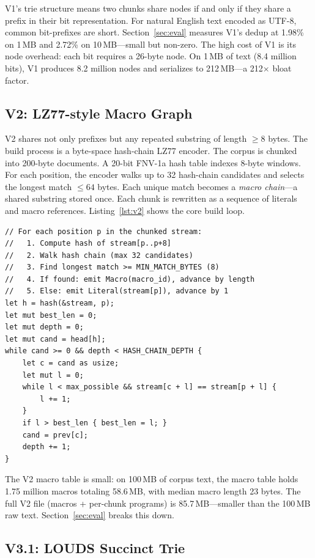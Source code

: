 \documentclass[conference]{IEEEtran}
\begin{document}
V1's trie structure means two chunks share nodes if and only if they share a prefix in their bit representation. For natural English text encoded as UTF-8, common bit-prefixes are short. Section~\ref{sec:eval} measures V1's dedup at 1.98\% on 1\,MB and 2.72\% on 10\,MB---small but non-zero. The high cost of V1 is its node overhead: each bit requires a 26-byte node. On 1\,MB of text (8.4 million bits), V1 produces 8.2 million nodes and serializes to 212\,MB---a 212$\times$ bloat factor.

\subsection{V2: LZ77-style Macro Graph}

V2 shares not only prefixes but any repeated substring of length $\geq 8$ bytes. The build process is a byte-space hash-chain LZ77 encoder. The corpus is chunked into 200-byte documents. A 20-bit FNV-1a hash table indexes 8-byte windows. For each position, the encoder walks up to 32 hash-chain candidates and selects the longest match $\leq 64$ bytes. Each unique match becomes a \emph{macro chain}---a shared substring stored once. Each chunk is rewritten as a sequence of literals and macro references. Listing~\ref{lst:v2} shows the core build loop.

\begin{lstlisting}[caption={V2 build: greedy LZ77 with byte-level hash chains.},label={lst:v2}]
// For each position p in the chunked stream:
//   1. Compute hash of stream[p..p+8]
//   2. Walk hash chain (max 32 candidates)
//   3. Find longest match >= MIN_MATCH_BYTES (8)
//   4. If found: emit Macro(macro_id), advance by length
//   5. Else: emit Literal(stream[p]), advance by 1
let h = hash(&stream, p);
let mut best_len = 0;
let mut depth = 0;
let mut cand = head[h];
while cand >= 0 && depth < HASH_CHAIN_DEPTH {
    let c = cand as usize;
    let mut l = 0;
    while l < max_possible && stream[c + l] == stream[p + l] {
        l += 1;
    }
    if l > best_len { best_len = l; }
    cand = prev[c];
    depth += 1;
}
\end{lstlisting}

The V2 macro table is small: on 100\,MB of corpus text, the macro table holds 1.75 million macros totaling 58.6\,MB, with median macro length 23 bytes. The full V2 file (macros + per-chunk programs) is 85.7\,MB---smaller than the 100\,MB raw text. Section~\ref{sec:eval} breaks this down.

\subsection{V3.1: LOUDS Succinct Trie}\label{sec:arch:v31}
\end{document}
